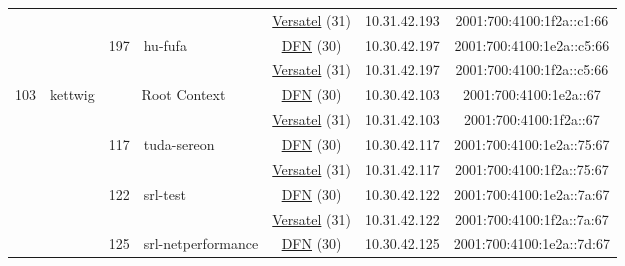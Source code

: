 \begin{small}
\begin{center}
\begin{longtable}{|c|c|c|c|c|c|c|c|}
  &  &  &  & \multicolumn{2}{|c|}{\tiny{\href{http://www.versatel.de}{Versatel} (31)}} & \tiny{10.31.42.193} & \tiny{2001:700:4100:1f2a::c1:66} \\* \cline{3-3}\cline{4-4}\cline{5-5}\cline{6-6}\cline{7-7}\cline{8-8}
  &  & \multirow{2}{*}{\tiny{197}} & \multicolumn{1}{|l|}{\multirow{2}{*}{\tiny{hu-fufa}}} & \multicolumn{2}{|c|}{\tiny{\href{https://www.dfn.de}{DFN} (30)}} & \tiny{10.30.42.197} & \tiny{2001:700:4100:1e2a::c5:66} \\* \cline{5-5}\cline{6-6}\cline{7-7}\cline{8-8}
  &  &  &  & \multicolumn{2}{|c|}{\tiny{\href{http://www.versatel.de}{Versatel} (31)}} & \tiny{10.31.42.197} & \tiny{2001:700:4100:1f2a::c5:66} \\ \hline
 \multirow{30}{*}{\tiny{103}} & \multicolumn{1}{|l|}{\multirow{30}{*}{\tiny{kettwig}}} & \multicolumn{2}{|c|}{\multirow{2}{*}{\tiny{Root Context}}} & \multicolumn{2}{|c|}{\tiny{\href{https://www.dfn.de}{DFN} (30)}} & \tiny{10.30.42.103} & \tiny{2001:700:4100:1e2a::67} \\* \cline{5-5}\cline{6-6}\cline{7-7}\cline{8-8}
  &  & \multicolumn{2}{|c|}{} & \multicolumn{2}{|c|}{\tiny{\href{http://www.versatel.de}{Versatel} (31)}} & \tiny{10.31.42.103} & \tiny{2001:700:4100:1f2a::67} \\* \cline{3-3}\cline{4-4}\cline{5-5}\cline{6-6}\cline{7-7}\cline{8-8}
  &  & \multirow{2}{*}{\tiny{117}} & \multicolumn{1}{|l|}{\multirow{2}{*}{\tiny{tuda-sereon}}} & \multicolumn{2}{|c|}{\tiny{\href{https://www.dfn.de}{DFN} (30)}} & \tiny{10.30.42.117} & \tiny{2001:700:4100:1e2a::75:67} \\* \cline{5-5}\cline{6-6}\cline{7-7}\cline{8-8}
  &  &  &  & \multicolumn{2}{|c|}{\tiny{\href{http://www.versatel.de}{Versatel} (31)}} & \tiny{10.31.42.117} & \tiny{2001:700:4100:1f2a::75:67} \\* \cline{3-3}\cline{4-4}\cline{5-5}\cline{6-6}\cline{7-7}\cline{8-8}
  &  & \multirow{2}{*}{\tiny{122}} & \multicolumn{1}{|l|}{\multirow{2}{*}{\tiny{srl-test}}} & \multicolumn{2}{|c|}{\tiny{\href{https://www.dfn.de}{DFN} (30)}} & \tiny{10.30.42.122} & \tiny{2001:700:4100:1e2a::7a:67} \\* \cline{5-5}\cline{6-6}\cline{7-7}\cline{8-8}
  &  &  &  & \multicolumn{2}{|c|}{\tiny{\href{http://www.versatel.de}{Versatel} (31)}} & \tiny{10.31.42.122} & \tiny{2001:700:4100:1f2a::7a:67} \\* \cline{3-3}\cline{4-4}\cline{5-5}\cline{6-6}\cline{7-7}\cline{8-8}
  &  & \multirow{2}{*}{\tiny{125}} & \multicolumn{1}{|l|}{\multirow{2}{*}{\tiny{srl-netperformance}}} & \multicolumn{2}{|c|}{\tiny{\href{https://www.dfn.de}{DFN} (30)}} & \tiny{10.30.42.125} & \tiny{2001:700:4100:1e2a::7d:67} \\* \cline{5-5}\cline{6-6}\cline{7-7}\cline{8-8}

\end{longtable}
\end{center}
\end{small}
